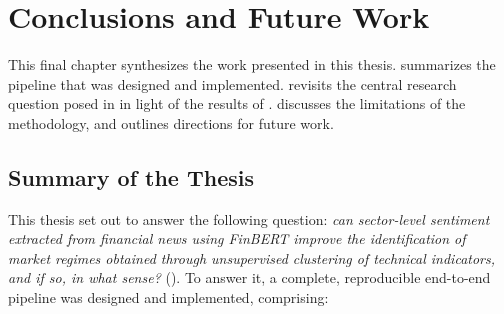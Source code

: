 \chapter{Conclusions and Future Work}
\label{ch:conclusions}

This final chapter synthesizes the work presented in this thesis.
 summarizes the pipeline that was designed and
implemented.  revisits the central research
question posed in  in light of the results of
.  discusses the limitations
of the methodology, and  outlines directions for
future work.

\section{Summary of the Thesis}
\label{sec:concl-summary}

This thesis set out to answer the following question: \emph{can
sector-level sentiment extracted from financial news using FinBERT improve
the identification of market regimes obtained through unsupervised
clustering of technical indicators, and if so, in what sense?}
(). To answer it, a complete, reproducible
end-to-end pipeline was designed and implemented, comprising:

